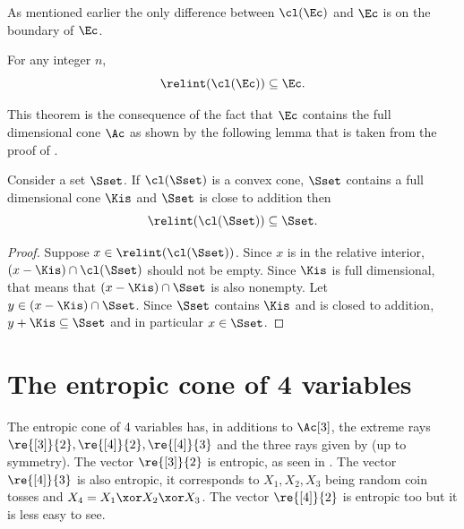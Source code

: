 \documentclass[11pt,twoside,a4paper,openright]{uclouvain-thesis}
\begin{document}
As mentioned earlier the only difference between $\cl(\Ec)$ and $\Ec$ is on the boundary of $\Ec$.

\begin{mytheo}
  \label{theo:relintcl}
  For any integer $n$,
  \[ \relint(\cl(\Ec)) \subseteq \Ec. \]
\end{mytheo}

This theorem is the consequence of the fact that $\Ec$ contains the full dimensional cone $\Ac$ as shown by the following lemma
that is taken from the proof of \cite[Theorem~1]{matus2007two}.

\begin{mylem}
  Consider a set $\Sset$.
  If $\cl(\Sset)$ is a convex cone, $\Sset$ contains a full dimensional cone $\Kis$ and $\Sset$ is close to addition then
  \[ \relint(\cl(\Sset)) \subseteq \Sset. \]
  \begin{proof}
    Suppose $x \in \relint(\cl(\Sset))$.
    Since $x$ is in the relative interior, $(x - \Kis) \cap \cl(\Sset)$ should not be empty.
    Since $\Kis$ is full dimensional, that means that $(x - \Kis) \cap \Sset$ is also nonempty.
    Let $y \in (x - \Kis) \cap \Sset$.
    Since $\Sset$ contains $\Kis$ and is closed to addition, $y + \Kis \subseteq \Sset$ and in particular $x \in \Sset$.
  \end{proof}
\end{mylem}





\section{The entropic cone of 4 variables}
\label{sec:4var}
The entropic cone of 4 variables has, in additions to $\Ac[3]$,
the extreme rays $\re{[3]}{2}, \re{[4]}{2}, \re{[4]}{3}$ and the three rays given by  (up to symmetry).
The vector $\re{[3]}{2}$ is entropic, as seen in .
The vector $\re{[4]}{3}$ is also entropic, it corresponds to $X_1, X_2, X_3$ being random coin tosses and $X_4 = X_1 \xor X_2 \xor X_3$.
The vector $\re{[4]}{2}$ is entropic too but it is less easy to see. %
\end{document}
